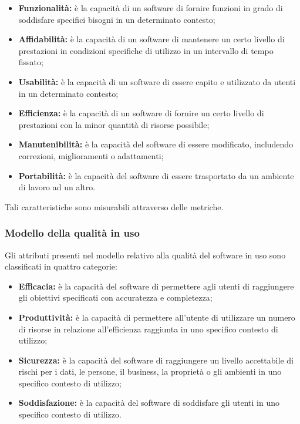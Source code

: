 \documentclass[PianoDiQualifica.tex]{subfiles}
\begin{document}
\begin{itemize}
\item \textbf{Funzionalità:} è la capacità di un software di fornire funzioni in grado di soddisfare specifici bisogni in un determinato contesto;
\item \textbf{Affidabilità:} è la capacità di un software di mantenere un certo livello di prestazioni in condizioni specifiche di utilizzo in un intervallo di tempo fissato;
\item \textbf{Usabilità:} è la capacità di un software di essere capito e utilizzato da utenti in un determinato contesto;
\item \textbf{Efficienza:} è la capacità di un software di fornire un certo livello di prestazioni con la minor quantità di risorse possibile;
\item \textbf{Manutenibilità:} è la capacità del software di essere modificato, includendo correzioni, miglioramenti o adattamenti;
\item \textbf{Portabilità:} è la capacità del software di essere trasportato da un ambiente di lavoro ad un altro.
\end{itemize}

Tali caratteristiche sono misurabili attraverso delle metriche.

\subsubsection{Modello della qualità in uso}
Gli attributi presenti nel modello relativo alla qualità del software in uso
sono classificati in quattro categorie:

\begin{itemize}
\item \textbf{Efficacia:} è la capacità del software di permettere agli utenti di raggiungere gli obiettivi specificati con accuratezza e completezza;
\item \textbf{Produttività:} è la capacità di permettere all’utente di utilizzare un numero di risorse in relazione all’efficienza raggiunta in uno specifico contesto di utilizzo;
\item \textbf{Sicurezza:} è la capacità del software di raggiungere un livello accettabile di rischi  per i dati, le persone, il business, la proprietà o gli ambienti in uno specifico contesto di utilizzo;
\item \textbf{Soddisfazione:} è la capacità del software di soddisfare gli utenti in uno specifico contesto di utilizzo.
\end{itemize}
\end{document}
